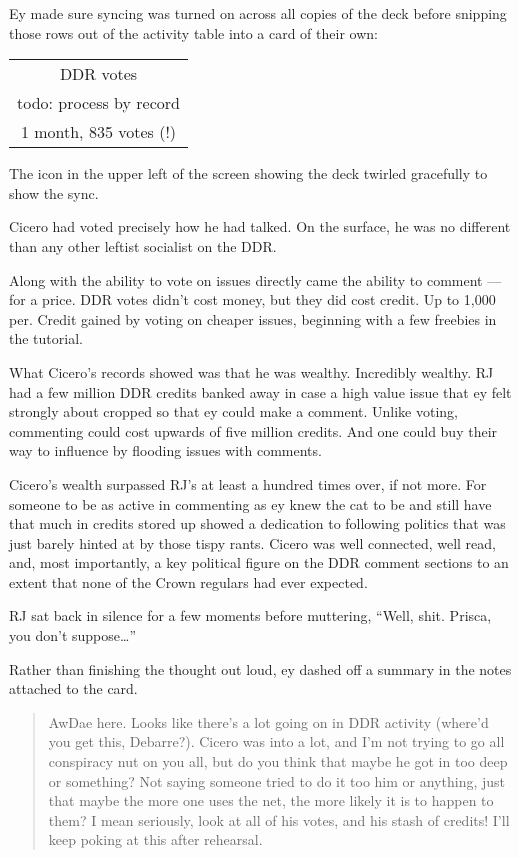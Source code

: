 Ey made sure syncing was turned on across all copies of the deck before snipping those rows out of the activity table into a card of their own:

\begin{longtable}[]{@{}c@{}}
\toprule
\endhead
DDR votes\tabularnewline
todo: process by record\tabularnewline
1 month, 835 votes (!)\tabularnewline
\bottomrule
\end{longtable}

The icon in the upper left of the screen showing the deck twirled gracefully to show the sync.

Cicero had voted precisely how he had talked. On the surface, he was no different than any other leftist socialist on the DDR.

Along with the ability to vote on issues directly came the ability to comment --- for a price. DDR votes didn't cost money, but they did cost credit. Up to 1,000 per. Credit gained by voting on cheaper issues, beginning with a few freebies in the tutorial.

What Cicero's records showed was that he was wealthy. Incredibly wealthy. RJ had a few million DDR credits banked away in case a high value issue that ey felt strongly about cropped so that ey could make a comment. Unlike voting, commenting could cost upwards of five million credits. And one could buy their way to influence by flooding issues with comments.

Cicero's wealth surpassed RJ's at least a hundred times over, if not more. For someone to be as active in commenting as ey knew the cat to be and still have that much in credits stored up showed a dedication to following politics that was just barely hinted at by those tispy rants. Cicero was well connected, well read, and, most importantly, a key political figure on the DDR comment sections to an extent that none of the Crown regulars had ever expected.

RJ sat back in silence for a few moments before muttering, ``Well, shit. Prisca, you don't suppose\ldots{}''

Rather than finishing the thought out loud, ey dashed off a summary in the notes attached to the card.

\begin{quote}
AwDae here. Looks like there's a lot going on in DDR activity (where'd you get this, Debarre?). Cicero was into a lot, and I'm not trying to go all conspiracy nut on you all, but do you think that maybe he got in too deep or something? Not saying someone tried to do it too him or anything, just that maybe the more one uses the net, the more likely it is to happen to them? I mean seriously, look at all of his votes, and his stash of credits! I'll keep poking at this after rehearsal.
\end{quote}

